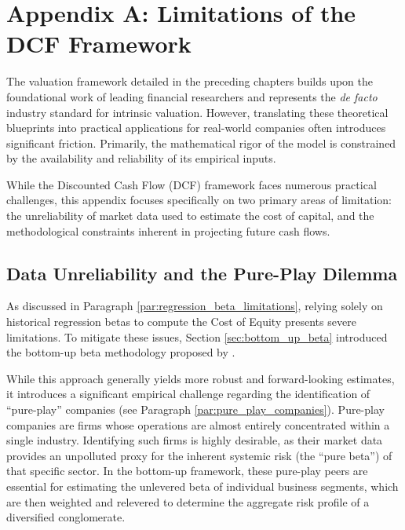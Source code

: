 \cleardoublepage
{}
{}
\chapter*{Appendix A: Limitations of the DCF Framework}

The valuation framework detailed in the preceding chapters builds upon the foundational work of leading financial researchers and represents the \textit{de facto} industry standard for intrinsic valuation. However, translating these theoretical blueprints into practical applications for real-world companies often introduces significant friction. Primarily, the mathematical rigor of the model is constrained by the availability and reliability of its empirical inputs.

While the Discounted Cash Flow (DCF) framework faces numerous practical challenges, this appendix focuses specifically on two primary areas of limitation: the unreliability of market data used to estimate the cost of capital, and the methodological constraints inherent in projecting future cash flows.

\section*{Data Unreliability and the Pure-Play Dilemma}

As discussed in Paragraph \ref{par:regression_beta_limitations}, relying solely on historical regression betas to compute the Cost of Equity presents severe limitations. To mitigate these issues, Section \ref{sec:bottom_up_beta} introduced the bottom-up beta methodology proposed by \textcite{damodaran_risk_parameters}.

While this approach generally yields more robust and forward-looking estimates, it introduces a significant empirical challenge regarding the identification of ``pure-play'' companies (see Paragraph \ref{par:pure_play_companies}). Pure-play companies are firms whose operations are almost entirely concentrated within a single industry. Identifying such firms is highly desirable, as their market data provides an unpolluted proxy for the inherent systemic risk (the ``pure beta'') of that specific sector. In the bottom-up framework, these pure-play peers are essential for estimating the unlevered beta of individual business segments, which are then weighted and relevered to determine the aggregate risk profile of a diversified conglomerate.

